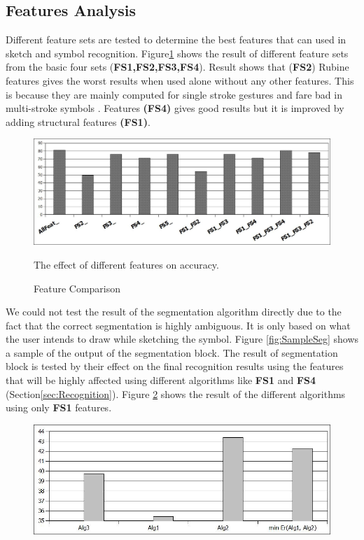 \documentclass{article}
\begin{document}
\subsection{Features Analysis}
\label{sec:featexp}
Different feature sets are tested to determine the best features that can used in sketch and symbol recognition. Figure\ref{fig:testFeaturesAll} shows the result of different feature sets from the basic four sets (\textbf{FS1,FS2,FS3,FS4}). Result shows that (\textbf{FS2}) Rubine features \cite{gestureexample12} gives the worst results when used alone without any other features. This is because they are mainly computed for single stroke gestures and fare bad in multi-stroke symbols \cite{compareFeaturSVM}. Features \textbf{(FS4)} gives good results but it is improved by adding structural features \textbf{(FS1)}.
 \begin{figure}
	\centering
		\includegraphics[scale=0.5]{images/testFeat.jpg}
	\caption{Feature Comparison} The effect of different features on accuracy.  %
	\label{fig:testFeaturesAll}
\end{figure}  

 We could not test the result of the segmentation algorithm directly due to the fact that the correct segmentation is highly ambiguous. It is only based on what the user intends to draw while sketching the symbol. Figure \ref{fig:SampleSeg} shows a sample of the output of the segmentation block. The result of segmentation block is tested by their effect on the final recognition results using the features that will be highly affected using different algorithms like \textbf{FS1} and \textbf{FS4} (Section\ref{sec:Recognition}). Figure \ref{fig:testFeatonly} shows the result of the different algorithms using only \textbf{FS1 }features. 
\begin{figure}
	\centering
		\includegraphics[scale=0.4]{images/testF1.jpg}
	\caption{} %
	\label{fig:testFeatonly}
\end{figure}  
\end{document}

